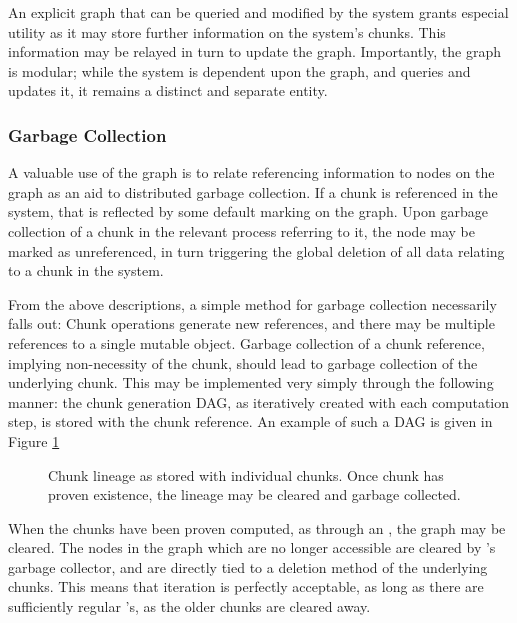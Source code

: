 An explicit graph that can be queried and modified by the system grants especial utility as it may store further information on the system's chunks.
This information may be relayed in turn to update the graph.
Importantly, the graph is modular; while the system is dependent upon the graph, and queries and updates it, it remains a distinct and separate entity.

\subsubsection{Garbage Collection}\label{sec:gc}

A valuable use of the graph is to relate referencing information to nodes on the graph as an aid to distributed garbage collection.
If a chunk is referenced in the system, that is reflected by some default marking on the graph.
Upon garbage collection of a chunk in the relevant \R process referring to it, the node may be marked as unreferenced, in turn triggering the global deletion of all data relating to a chunk in the system.

From the above descriptions, a simple method for garbage collection necessarily falls out:
Chunk operations generate new references, and there may be multiple references to a single mutable object.
Garbage collection of a chunk reference, implying non-necessity of the chunk, should lead to garbage collection of the underlying chunk.
This may be implemented very simply through the following manner: the chunk generation DAG, as iteratively created with each computation step, is stored with the chunk reference.
An example of such a DAG is given in Figure \cref{fig:gc}

\begin{figure}

\caption{Chunk lineage as stored with individual chunks. Once chunk has proven existence, the lineage may be cleared and garbage collected.}
\label{fig:gc}
\end{figure}

When the chunks have been proven computed, as through an , the graph may be cleared.
The nodes in the graph which are no longer accessible are cleared by \R's garbage collector, and are directly tied to a deletion method of the underlying chunks.
This means that iteration is perfectly acceptable, as long as there are sufficiently regular 's, as the older chunks are cleared away.
